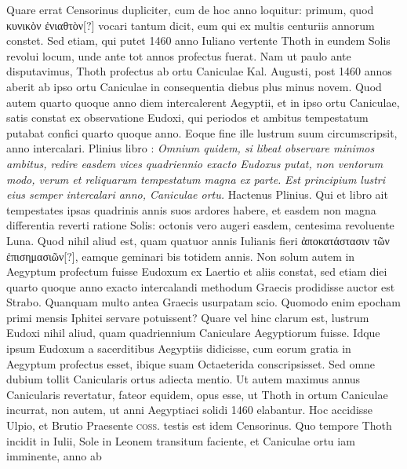 Quare errat Censorinus
dupliciter, cum de hoc anno loquitur: primum, quod \textgreek{κυνικὸν
ἐνιαθτὸν}[?] vocari tantum dicit, eum qui ex multis centuriis annorum
constet.
Sed etiam, qui putet 1460 anno Iuliano vertente Thoth in
eundem Solis revolui locum, unde ante tot annos profectus fuerat.
Nam ut paulo ante disputavimus, Thoth profectus ab ortu Caniculae
Kal. Augusti, post 1460 annos aberit ab ipso ortu Caniculae in consequentia
diebus plus minus novem.
Quod autem quarto quoque
anno diem intercalerent Aegyptii, et in ipso ortu Caniculae, satis
constat ex observatione Eudoxi, qui periodos et ambitus tempestatum
putabat confici quarto quoque anno.
Eoque fine ille lustrum
suum circumscripsit, anno intercalari.
Plinius libro : \textit{Omnium
quidem, si libeat observare minimos ambitus, redire easdem vices quadriennio
exacto Eudoxus putat, non ventorum modo, verum et reliquarum
tempestatum magna ex parte.}
\textit{Est principium lustri eius semper intercalari
anno, Caniculae ortu.}
Hactenus Plinius.
Qui et libro  ait tempestates
ipsas quadrinis annis suos ardores habere, et easdem non magna
differentia reverti ratione Solis: octonis vero augeri easdem, centesima
revoluente Luna.
Quod nihil aliud est, quam quatuor annis Iulianis
fieri \textgreek{ἀποκατάστασιν τῶν ἐπισημασιῶν}[?], eamque geminari bis totidem
annis.
%
Non solum autem in Aegyptum profectum fuisse Eudoxum
ex Laertio et aliis constat, sed etiam diei quarto quoque anno
exacto intercalandi methodum Graecis prodidisse auctor est Strabo.
Quanquam multo antea Graecis usurpatam scio.
Quomodo enim
epocham primi mensis Iphitei servare potuissent?
Quare vel hinc
clarum est, lustrum Eudoxi nihil aliud, quam quadriennium Caniculare
Aegyptiorum fuisse.
Idque ipsum Eudoxum a sacerditibus
Aegyptiis didicisse, cum eorum gratia in Aegyptum profectus esset,
ibique suam Octaeterida conscripsisset.
Sed omne dubium tollit Canicularis
ortus adiecta mentio.
Ut autem maximus annus Canicularis
revertatur, fateor equidem, opus esse, ut Thoth in ortum Caniculae
incurrat, non autem, ut anni Aegyptiaci solidi 1460 elabantur.
Hoc accidisse Ulpio, et Brutio Praesente \textsc{coss}.
 testis est idem Censorinus.
Quo tempore Thoth incidit in  Iulii, Sole in Leonem transitum
faciente, et Caniculae ortu iam imminente, anno ab %
